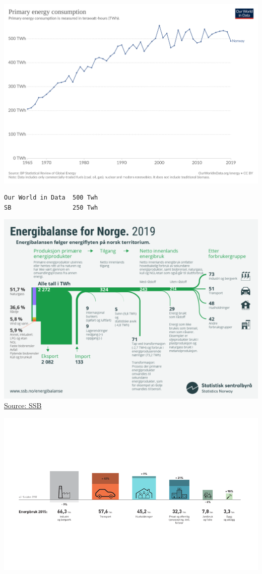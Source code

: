 \documentclass[
]{book}
\begin{document}
\includegraphics{fig/owid_energy_use_no.png}

\begin{verbatim}
Our World in Data  500 Twh
SB                 250 Twh
\end{verbatim}

\includegraphics{fig/SSB_2019_Energibalanse_Norge.png}
\href{https://www.ssb.no/energi-og-industri/artikler-og-publikasjoner/reviderte-tall-for-tilgang-og-forbruk-av-energi-og-energiintensiteter}{Source: SSB}

\includegraphics{fig/Utvikling_energibruk_Norge.png}
\end{document}

